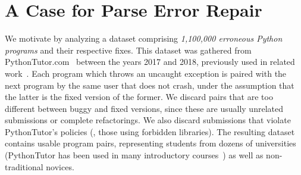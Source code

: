 \section{A Case for Parse Error Repair}
\label{sec:error-analysis}

We motivate \toolname by analyzing a dataset
comprising \emph{1,100,000 erroneous Python programs}
and their respective fixes.
%
This dataset was gathered from PythonTutor.com~\citep{Guo2013}
between the years 2017 and 2018, previously used in related
work~\citep{Endres2019, Cosman2020}.
%
Each program which throws an uncaught \python exception
is paired with the next program by the same user that does
not crash, under the assumption that the latter is the fixed
version of the former.
%
We discard pairs that are too different between buggy
and fixed versions, since these are usually unrelated
submissions or complete refactorings.
%
We also discard submissions that violate PythonTutor's
policies (\eg, those using forbidden libraries).
%
The resulting dataset contains usable program pairs,
representing students from dozens of universities
(PythonTutor has been used in many introductory
courses~\citep{Guo2013}) as well as non-traditional
novices.

